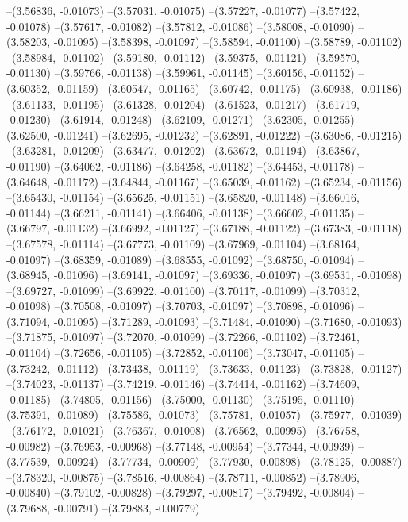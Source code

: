 --(3.56836, -0.01073)
--(3.57031, -0.01075)
--(3.57227, -0.01077)
--(3.57422, -0.01078)
--(3.57617, -0.01082)
--(3.57812, -0.01086)
--(3.58008, -0.01090)
--(3.58203, -0.01095)
--(3.58398, -0.01097)
--(3.58594, -0.01100)
--(3.58789, -0.01102)
--(3.58984, -0.01102)
--(3.59180, -0.01112)
--(3.59375, -0.01121)
--(3.59570, -0.01130)
--(3.59766, -0.01138)
--(3.59961, -0.01145)
--(3.60156, -0.01152)
--(3.60352, -0.01159)
--(3.60547, -0.01165)
--(3.60742, -0.01175)
--(3.60938, -0.01186)
--(3.61133, -0.01195)
--(3.61328, -0.01204)
--(3.61523, -0.01217)
--(3.61719, -0.01230)
--(3.61914, -0.01248)
--(3.62109, -0.01271)
--(3.62305, -0.01255)
--(3.62500, -0.01241)
--(3.62695, -0.01232)
--(3.62891, -0.01222)
--(3.63086, -0.01215)
--(3.63281, -0.01209)
--(3.63477, -0.01202)
--(3.63672, -0.01194)
--(3.63867, -0.01190)
--(3.64062, -0.01186)
--(3.64258, -0.01182)
--(3.64453, -0.01178)
--(3.64648, -0.01172)
--(3.64844, -0.01167)
--(3.65039, -0.01162)
--(3.65234, -0.01156)
--(3.65430, -0.01154)
--(3.65625, -0.01151)
--(3.65820, -0.01148)
--(3.66016, -0.01144)
--(3.66211, -0.01141)
--(3.66406, -0.01138)
--(3.66602, -0.01135)
--(3.66797, -0.01132)
--(3.66992, -0.01127)
--(3.67188, -0.01122)
--(3.67383, -0.01118)
--(3.67578, -0.01114)
--(3.67773, -0.01109)
--(3.67969, -0.01104)
--(3.68164, -0.01097)
--(3.68359, -0.01089)
--(3.68555, -0.01092)
--(3.68750, -0.01094)
--(3.68945, -0.01096)
--(3.69141, -0.01097)
--(3.69336, -0.01097)
--(3.69531, -0.01098)
--(3.69727, -0.01099)
--(3.69922, -0.01100)
--(3.70117, -0.01099)
--(3.70312, -0.01098)
--(3.70508, -0.01097)
--(3.70703, -0.01097)
--(3.70898, -0.01096)
--(3.71094, -0.01095)
--(3.71289, -0.01093)
--(3.71484, -0.01090)
--(3.71680, -0.01093)
--(3.71875, -0.01097)
--(3.72070, -0.01099)
--(3.72266, -0.01102)
--(3.72461, -0.01104)
--(3.72656, -0.01105)
--(3.72852, -0.01106)
--(3.73047, -0.01105)
--(3.73242, -0.01112)
--(3.73438, -0.01119)
--(3.73633, -0.01123)
--(3.73828, -0.01127)
--(3.74023, -0.01137)
--(3.74219, -0.01146)
--(3.74414, -0.01162)
--(3.74609, -0.01185)
--(3.74805, -0.01156)
--(3.75000, -0.01130)
--(3.75195, -0.01110)
--(3.75391, -0.01089)
--(3.75586, -0.01073)
--(3.75781, -0.01057)
--(3.75977, -0.01039)
--(3.76172, -0.01021)
--(3.76367, -0.01008)
--(3.76562, -0.00995)
--(3.76758, -0.00982)
--(3.76953, -0.00968)
--(3.77148, -0.00954)
--(3.77344, -0.00939)
--(3.77539, -0.00924)
--(3.77734, -0.00909)
--(3.77930, -0.00898)
--(3.78125, -0.00887)
--(3.78320, -0.00875)
--(3.78516, -0.00864)
--(3.78711, -0.00852)
--(3.78906, -0.00840)
--(3.79102, -0.00828)
--(3.79297, -0.00817)
--(3.79492, -0.00804)
--(3.79688, -0.00791)
--(3.79883, -0.00779)

